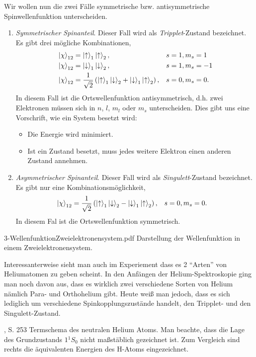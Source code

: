 Wir wollen nun die zwei Fälle symmetrische bzw. antisymmetrische
Spinwellenfunktion unterscheiden. \begin{enumerate}[label=\alph{*})]
  \item \textit{Symmetrischer Spinanteil}. Dieser Fall wird als
  \emph{Tripplet}-Zustand bezeichnet. Es gibt drei mögliche Kombinationen,
\begin{align*}
&\left|\chi\right\rangle_{12} = \left|\uparrow\right\rangle_1\left|\uparrow\right\rangle_2, && s=1, m_s = 1\\
&\left|\chi\right\rangle_{12} = \left|\downarrow\right\rangle_1\left|\downarrow\right\rangle_2, && s=1, m_s = -1\\
&\left|\chi\right\rangle_{12} = \frac{1}{\sqrt{2}}\left(\left|\uparrow\right\rangle_1\left|\downarrow\right\rangle_2
+\left|\downarrow\right\rangle_1\left|\uparrow\right\rangle_2\right),
&& s=0, m_s = 0.
\end{align*}
In diesem Fall ist die Ortswellenfunktion antisymmetrisch, d.h. zwei Elektronen
müssen sich in $n$, $l$, $m_l$ oder $m_s$ unterscheiden. Dies gibt uns eine
Vorschrift, wie ein System besetzt wird:
\begin{itemize}[label=-]
  \item Die Energie wird minimiert.
  \item Ist ein Zustand besetzt, muss jedes weitere Elektron einen anderen
  Zustand annehmen.
\end{itemize}
\item \textit{Asymmetrischer Spinanteil}. Dieser Fall wird als
\emph{Singulett}-Zustand bezeichnet. Es gibt nur eine Kombinationsmöglichkeit,
\begin{align*}
&\left|\chi\right\rangle_{12} = \frac{1}{\sqrt{2}}\left(\left|\uparrow\right\rangle_1\left|\downarrow\right\rangle_2
-\left|\downarrow\right\rangle_1\left|\uparrow\right\rangle_2\right),
&& s=0, m_s = 0.
\end{align*}
In diesem Fal ist die Ortswellenfunktion symmetrisch.
\end{enumerate}

\sfigure%
	{3-WellenfunktionZweielektronensystem.pdf}
	{}
	{Darstellung der Wellenfunktion in einem Zweielektronensystem.}

Interessanterweise sieht man auch im Experiement dass es 2 ``Arten'' von
Heliumatomen zu geben scheint.  In den Anfängen der Helium-Spektroskopie ging man noch
davon aus, dass es wirklich zwei verschiedene Sorten von Helium nämlich Para-
und Orthohelium gibt. Heute weiß man jedoch, dass es sich lediglich
um verschiedene Spinkopplungszustände handelt, den Tripplet- und den
Singulett-Zustand.

	{\HertelSchulz, S. 253}
	{Termschema des neutralen Helium Atoms. Man beachte, dass die 
Lage des Grundzustands $1{}^1S_0$ nicht maßstäblich gezeichnet ist.
Zum Vergleich sind rechts die äquivalenten Energien des H-Atoms eingezeichnet.}

